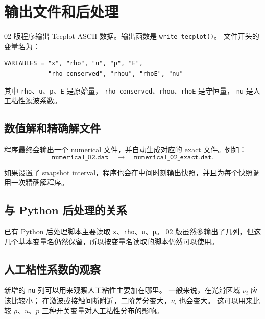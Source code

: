 \section{输出文件和后处理}

02 版程序输出 Tecplot ASCII 数据。输出函数是 \texttt{write\_tecplot()}。
文件开头的变量名为：
\begin{lstlisting}
VARIABLES = "x", "rho", "u", "p", "E",
            "rho_conserved", "rhou", "rhoE", "nu"
\end{lstlisting}

其中 \texttt{rho}、\texttt{u}、\texttt{p}、\texttt{E} 是原始量，
\texttt{rho\_conserved}、\texttt{rhou}、\texttt{rhoE} 是守恒量，
\texttt{nu} 是人工粘性滤波系数。

\subsection{数值解和精确解文件}

程序最终会输出一个 numerical 文件，并自动生成对应的 exact 文件。例如：
\[
\texttt{numerical\_02.dat}
\quad\rightarrow\quad
\texttt{numerical\_02\_exact.dat}.
\]

如果设置了 snapshot interval，程序也会在中间时刻输出快照，并且为每个快照调用一次精确解程序。

\subsection{与 Python 后处理的关系}

已有 Python 后处理脚本主要读取 \texttt{x}、\texttt{rho}、\texttt{u}、\texttt{p}。
02 版虽然多输出了几列，但这几个基本变量名仍然保留，所以按变量名读取的脚本仍然可以使用。

\subsection{人工粘性系数的观察}

新增的 \texttt{nu} 列可以用来观察人工粘性主要加在哪里。
一般来说，在光滑区域 \(\nu_i\) 应该比较小；
在激波或接触间断附近，二阶差分变大，\(\nu_i\) 也会变大。
这可以用来比较 \(\rho\)、\(u\)、\(p\) 三种开关变量对人工粘性分布的影响。
